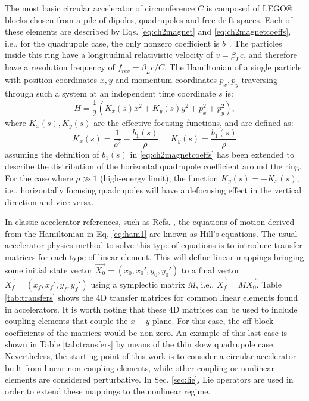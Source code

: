 The most basic circular accelerator of circumference $C$ is composed of LEGO® blocks chosen from a pile of dipoles, quadrupoles and free drift spaces. Each of these elements are described by Eqs. \ref{eq:ch2magnet} and \ref{eq:ch2magnetcoeffs}, i.e., for the quadrupole case, the only nonzero coefficient is $b_1$. The particles inside this ring have a longitudinal relativistic velocity of $v=\beta_L c$, and therefore have a revolution frequency of $f_{rev}=\beta_L c/C$. The Hamiltonian of a single particle with position coordinates $x,y$ and momentum coordinates $p_x,p_y$ traversing through such a system at an independent time coordinate $s$ is:
\begin{equation}
    \label{eq:ham1}
    H=\frac{1}{2}\left( K_x(s)x^2+ K_y(s)y^2+ p_x^2 + p_y^2\right),
\end{equation}
where $K_x(s),K_y(s)$ are the effective focusing functions, and are defined as:
\begin{equation}
    \label{eq:kx}
    K_x(s)=\frac{1}{\rho^2}-\frac{b_1(s)}{\rho}, \quad K_y(s)=\frac{b_1(s)}{\rho}
\end{equation}
assuming the definition of $b_1(s)$ in \ref{eq:ch2magnetcoeffs} has been extended to describe the distribution of the horizontal quadrupole coefficient around the ring. For the case where $\rho\gg 1$ (high-energy limit), the function $K_y(s)=-K_x(s)$, i.e., horizontally focusing quadrupoles will have a defocusing effect in the vertical direction and vice versa. 

In classic accelerator references, such as Refs. \cite{sylee,wolski,Wiedemann2015}, the equations of motion derived from the Hamiltonian in Eq. \ref{eq:ham1} are known as Hill's equations. The usual accelerator-physics method to solve this type of equations is to introduce transfer matrices for each type of linear element. This will define linear mappings bringing some initial state vector $\vec{X_0} = \left( x_0,x_0',y_0,y_0' \right)$ to a final vector $\vec{X_f} = \left( x_f,x_f',y_f,y_f' \right)$ using a symplectic matrix $M$, i.e., $\vec{X_f}=M\vec{X_0}$. Table \ref{tab:transfers} shows the 4D transfer matrices for common linear elements found in accelerators. It is worth noting that these 4D matrices can be used to include coupling elements that couple the $x-y$ plane. For this case, the off-block coefficients of the matrices would be non-zero. An example of this last case is shown in Table \ref{tab:transfers} by means of the thin skew quadrupole case. Nevertheless, the starting point of this work is to consider a circular accelerator built from linear non-coupling elements, while other coupling or nonlinear elements are considered perturbative. In Sec. \ref{sec:lie}, Lie operators are used in order to extend these mappings to the nonlinear regime.     

